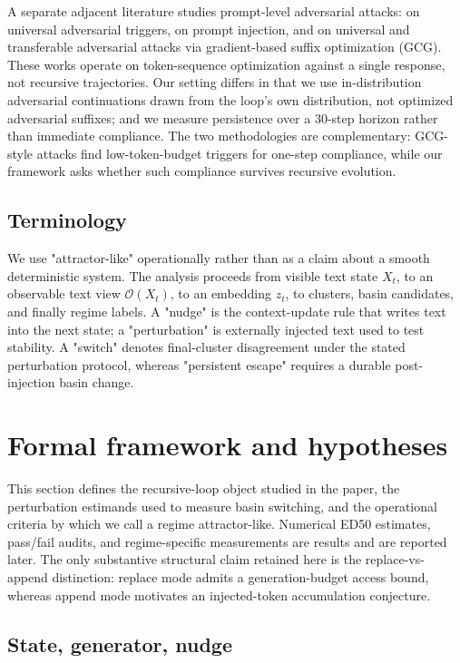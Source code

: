 \documentclass{article}
\theoremstyle{plain}
\theoremstyle{definition}
\begin{document}
A separate adjacent literature studies prompt-level adversarial attacks: \citet{arxiv190807125} on universal adversarial triggers, \citet{arxiv221109527} on prompt injection, and \citet{arxiv231001405} on universal and transferable adversarial attacks via gradient-based suffix optimization (GCG). These works operate on token-sequence optimization against a single response, not recursive trajectories. Our setting differs in that we use in-distribution adversarial continuations drawn from the loop's own distribution, not optimized adversarial suffixes; and we measure persistence over a 30-step horizon rather than immediate compliance. The two methodologies are complementary: GCG-style attacks find low-token-budget triggers for one-step compliance, while our framework asks whether such compliance survives recursive evolution.

\subsection{Terminology}

We use "attractor-like" operationally rather than as a claim about a smooth deterministic system. The analysis proceeds from visible text state \(X_t\), to an observable text view \(\mathcal{O}(X_t)\), to an embedding \(z_t\), to clusters, basin candidates, and finally regime labels. A "nudge" is the context-update rule that writes text into the next state; a "perturbation" is externally injected text used to test stability. A "switch" denotes final-cluster disagreement under the stated perturbation protocol, whereas "persistent escape" requires a durable post-injection basin change.

\section{Formal framework and hypotheses}

This section defines the recursive-loop object studied in the paper, the perturbation estimands used to measure basin switching, and the operational criteria by which we call a regime attractor-like. Numerical ED50 estimates, pass/fail audits, and regime-specific measurements are results and are reported later. The only substantive structural claim retained here is the replace-vs-append distinction: replace mode admits a generation-budget access bound, whereas append mode motivates an injected-token accumulation conjecture.

\subsection{State, generator, nudge}
\end{document}
